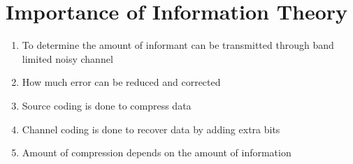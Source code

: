 \documentclass[11pt,a4paper]{book}
\begin{document}
\section{Importance of Information Theory}
\begin{enumerate}
    \item To determine the amount of informant can be transmitted through band limited noisy channel
    \item How much error can be reduced and corrected
    \item Source coding is done to compress data
    \item Channel coding is done to recover data by adding extra bits
    \item Amount of compression depends on the amount of information
\end{enumerate}
\end{document}
